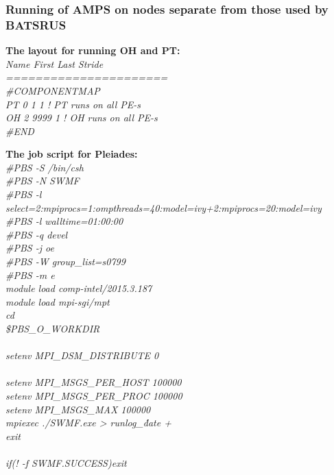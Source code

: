 \subsubsection{Running of AMPS on nodes separate from those used by BATSRUS}


{\bf The layout for running OH and PT:}
\\
{\it Name First Last Stride\\
======================\\
\#COMPONENTMAP\\
PT       0 1    1   ! PT runs on all PE-s\\
OH       2 9999    1   ! OH runs on all PE-s\\
\#END }


{\bf The job script for Pleiades:}
\\
{\it 
\#PBS -S /bin/csh\\
\#PBS -N SWMF\\
\#PBS -l select=2:mpiprocs=1:ompthreads=40:model=ivy+2:mpiprocs=20:model=ivy\\
\#PBS -l walltime=01:00:00\\
\#PBS -q devel\\
\#PBS -j oe\\
\#PBS -W group\_list=s0799\\
\#PBS -m e\\
module load comp-intel/2015.3.187\\
module load mpi-sgi/mpt\\
cd \\\$PBS\_O\_WORKDIR\\
\\
setenv MPI\_DSM\_DISTRIBUTE 0\\
\\
setenv MPI\_MSGS\_PER\_HOST 100000\\
setenv MPI\_MSGS\_PER\_PROC 100000\\
setenv MPI\_MSGS\_MAX 100000\\
mpiexec ./SWMF.exe > runlog\_\'date +%
\\
exit\\
\\
if(! -f SWMF.SUCCESS)exit\\
}

